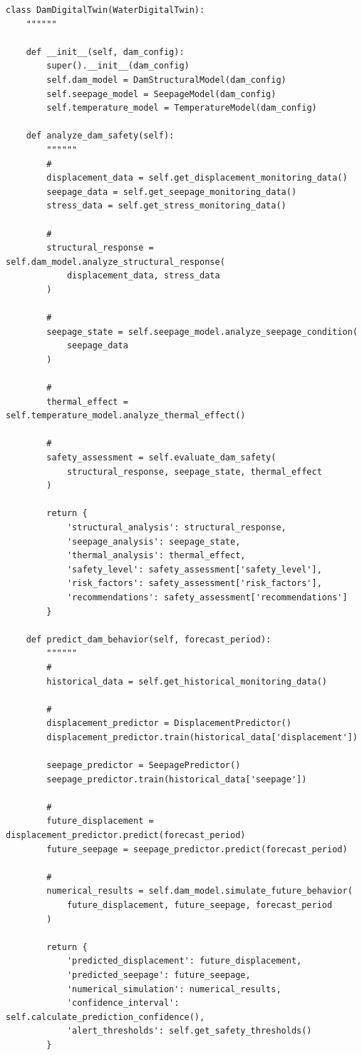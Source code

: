 \begin{lstlisting}[style=python]
class DamDigitalTwin(WaterDigitalTwin):
    """"""
    
    def __init__(self, dam_config):
        super().__init__(dam_config)
        self.dam_model = DamStructuralModel(dam_config)
        self.seepage_model = SeepageModel(dam_config)
        self.temperature_model = TemperatureModel(dam_config)
        
    def analyze_dam_safety(self):
        """"""
        # 
        displacement_data = self.get_displacement_monitoring_data()
        seepage_data = self.get_seepage_monitoring_data()
        stress_data = self.get_stress_monitoring_data()
        
        # 
        structural_response = self.dam_model.analyze_structural_response(
            displacement_data, stress_data
        )
        
        # 
        seepage_state = self.seepage_model.analyze_seepage_condition(
            seepage_data
        )
        
        # 
        thermal_effect = self.temperature_model.analyze_thermal_effect()
        
        # 
        safety_assessment = self.evaluate_dam_safety(
            structural_response, seepage_state, thermal_effect
        )
        
        return {
            'structural_analysis': structural_response,
            'seepage_analysis': seepage_state,
            'thermal_analysis': thermal_effect,
            'safety_level': safety_assessment['safety_level'],
            'risk_factors': safety_assessment['risk_factors'],
            'recommendations': safety_assessment['recommendations']
        }
        
    def predict_dam_behavior(self, forecast_period):
        """"""
        # 
        historical_data = self.get_historical_monitoring_data()
        
        # 
        displacement_predictor = DisplacementPredictor()
        displacement_predictor.train(historical_data['displacement'])
        
        seepage_predictor = SeepagePredictor()
        seepage_predictor.train(historical_data['seepage'])
        
        # 
        future_displacement = displacement_predictor.predict(forecast_period)
        future_seepage = seepage_predictor.predict(forecast_period)
        
        # 
        numerical_results = self.dam_model.simulate_future_behavior(
            future_displacement, future_seepage, forecast_period
        )
        
        return {
            'predicted_displacement': future_displacement,
            'predicted_seepage': future_seepage,
            'numerical_simulation': numerical_results,
            'confidence_interval': self.calculate_prediction_confidence(),
            'alert_thresholds': self.get_safety_thresholds()
        }
\end{lstlisting}

